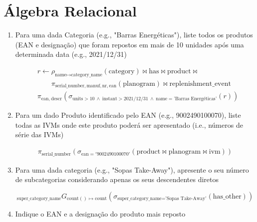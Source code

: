 \documentclass[12pt,a4paper]{article}
\newcommand{\op}{\text}
\begin{document}
  \sffamily
  \section*{Álgebra Relacional}

  \begin{enumerate}
    \item Para uma dada Categoria (e.g., "Barras Energéticas"), liste todos os produtos (EAN e designação) que foram repostos em mais de 10 unidades após uma determinada data (e.g., 2021/12/31)

    \[
      \begin{aligned}
      &r \leftarrow \rho_{\op{name}\mapsto\op{category\_name}}(\op{category}) \bowtie \op{has} \bowtie \op{product} \bowtie\\
      & \quad\quad\pi_{\op{serial\_number},\op{manuf},\op{nr},\op{ean}}(\op{planogram}) \bowtie \op{replenishment\_event}\\
      &\pi_{\op{ean},~\op{descr}} \left(
        \sigma_{\op{units} > 10~\land~\op{instant} > \text{2021/12/31}~\land~\op{name} = \text{'Barras Energéticas'}} (r)
      \right)
      \end{aligned}
    \]

    \item Para um dado Produto identificado pelo EAN (e.g., 9002490100070), liste todas as IVMs onde este produto poderá ser apresentado (i.e., números de série das IVMs)

    \[
      \begin{aligned}
        \pi_{\op{serial\_number}}\left(\sigma_{\op{ean}='9002490100070'}\left(\op{product} \bowtie \op{planogram} \bowtie \op{ivm}\right)\right)
      \end{aligned}
    \]

    \item Para uma dada categoria (e.g., "Sopas Take-Away"), apresente o seu número de subcategorias considerando apenas os seus descendentes diretos

    \[
      _{\op{super\_category\_name}}G_{\op{count}()\mapsto \op{count}}\left(\sigma_{\op{super\_category\_name}=\text{'Sopas Take-Away'}}(\op{has\_other})\right)
    \]

    \item Indique o EAN e a designação do produto mais reposto

    \[
    \]
  \end{enumerate}
  
\end{document}
